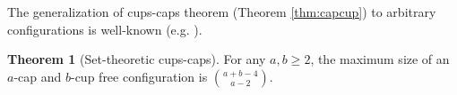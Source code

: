 \documentclass{amsart}
\theoremstyle{definition}
\newtheorem{theorem}[thm]{Theorem}
\newtheorem{lemma}[thm]{Lemma}
\numberwithin{thm}{section}
\begin{document}

The generalization of cups-caps theorem (Theorem \ref{thm:capcup}) to arbitrary configurations is well-known (e.g. \cite{moshkovitz2014ramsey}).
\begin{theorem}[Set-theoretic cups-caps]
\label{thm:capcup-set}
For any $a, b \geq 2$, the maximum size of an $a$-cap and $b$-cup free configuration is $\binom{a+b-4}{a-2}$.
\end{theorem}
\end{document}
